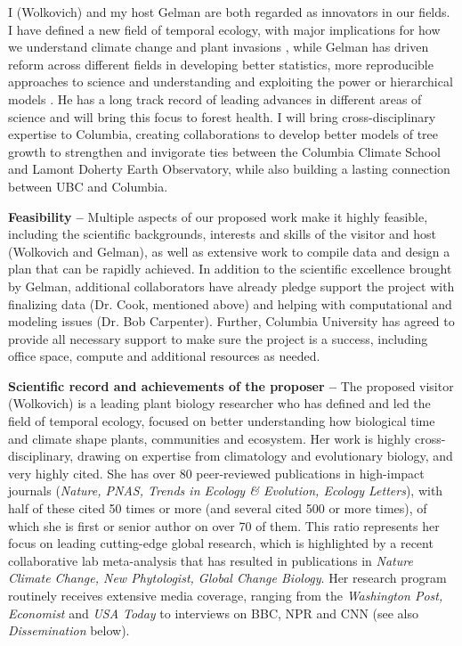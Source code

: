 \documentclass[11pt]{article}
\begin{document}
I (Wolkovich) and my host Gelman are both regarded as innovators in our fields. I have defined a new field of temporal ecology, with major implications for how we understand climate change and plant invasions \citep{tempeco,cleland2024effects}, while Gelman has driven reform across different fields in developing better statistics, more reproducible approaches to science and understanding and exploiting the power or hierarchical models \citep{regotherstories,Schofield2016,BDA,gelmanhill}. He has a long track record of leading advances in different areas of science and will bring this focus to forest health. I will bring cross-disciplinary expertise to Columbia, creating collaborations to develop better models of tree growth to strengthen and invigorate ties between the Columbia Climate School and Lamont Doherty Earth Observatory, while also building a lasting connection between UBC and Columbia. %

{\bf Feasibility --} 
Multiple aspects of our proposed work make it highly feasible, including the scientific backgrounds, interests and skills of the visitor and host (Wolkovich and Gelman), as well as extensive work to compile data and design a plan that can be rapidly achieved. In addition to the scientific excellence brought by Gelman, additional collaborators have already pledge support the project with finalizing data (Dr. Cook, mentioned above) and helping with computational and modeling issues (Dr. Bob Carpenter). Further, Columbia University has agreed to provide all necessary support to make sure the project is a success, including office space, compute and additional resources as needed.%

{\bf Scientific record and achievements of the proposer --} %
The proposed visitor (Wolkovich) is a leading plant biology researcher who has defined and led the field of temporal ecology, focused on better understanding how biological time and climate shape plants, communities and ecosystem. Her work is highly cross-disciplinary, drawing on expertise from climatology and evolutionary biology, and very highly cited. She has over 80 peer-reviewed publications in high-impact journals (\emph{Nature, PNAS, Trends in Ecology \& Evolution, Ecology Letters}), with half of these cited 50 times or more (and several cited 500 or more times), of which she is first or senior author on over 70 of them. This ratio represents her focus on leading cutting-edge global research, which is highlighted by a recent collaborative lab meta-analysis that has resulted in publications in \emph{Nature Climate Change, New Phytologist, Global Change Biology}. Her research program routinely receives extensive media coverage, ranging from the \emph{Washington Post, Economist} and  \emph{USA Today} to interviews on BBC, NPR and CNN (see also \emph{Dissemination} below). 
\end{document}
